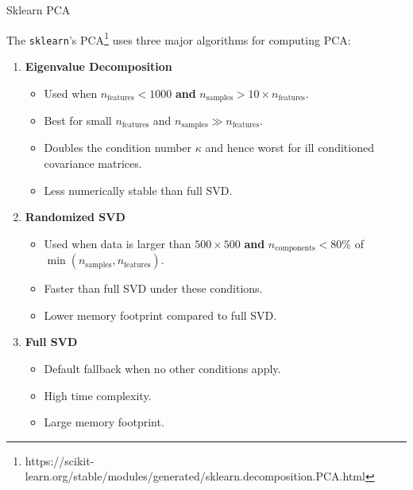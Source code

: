 \documentclass{beamer}
\begin{document}
\begin{frame}{Sklearn PCA}

The \texttt{sklearn}'s PCA\footnote{\scriptsize{https://scikit-learn.org/stable/modules/generated/sklearn.decomposition.PCA.html}} uses three major algorithms for computing PCA:
\begin{enumerate}
    \item \textbf{Eigenvalue Decomposition} 
    \begin{itemize}
        \item Used when \( n_{\text{features}} < 1000 \) \textbf{and} \( n_{\text{samples}} > 10 \times n_{\text{features}} \).
        \item Best for small \( n_{\text{features}} \) and \( n_{\text{samples}} \gg n_{\text{features}} \).
        \item Doubles the condition number \( \kappa \) and hence worst for ill conditioned covariance matrices.
        \item Less numerically stable than full SVD.
    \end{itemize}

    \item \textbf{Randomized SVD} 
    \begin{itemize}
        \item Used when data is larger than \( 500 \times 500 \) \textbf{and} \( n_{\text{components}} < 80\% \) of \( \min(n_{\text{samples}}, n_{\text{features}}) \).
        \item Faster than full SVD under these conditions.
        \item Lower memory footprint compared to full SVD.
    \end{itemize}

    \item \textbf{Full SVD} 
    \begin{itemize}
        \item Default fallback when no other conditions apply.
        \item High time complexity.
        \item Large memory footprint.
    \end{itemize}
\end{enumerate}

\end{frame}


\end{document}
